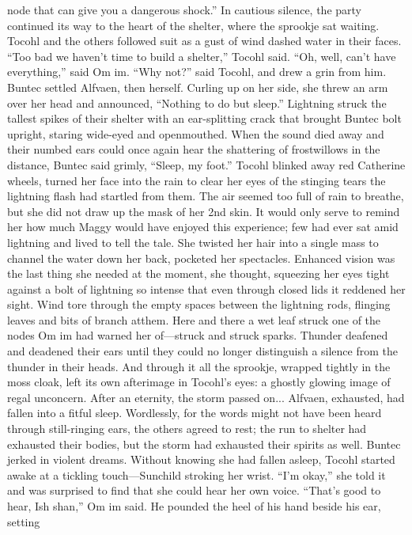 \documentclass[9pt]{article}
\begin{document}
node that can give you a dangerous shock.”
In cautious silence, the party continued its way to the heart of the shelter, where the sprookje sat
waiting. Tocohl and the others followed suit as a gust of wind dashed water in their faces.
“Too bad we haven’t time to build a shelter,” Tocohl said.
“Oh, well, can’t have everything,” said Om im.
“Why not?” said Tocohl, and drew a grin from him.
Buntec settled Alfvaen, then herself. Curling up on her side, she threw an arm over her head and
announced, “Nothing to do but sleep.”
Lightning struck the tallest spikes of their shelter with an ear-splitting crack that brought Buntec bolt
upright, staring wide-eyed and openmouthed. When the sound died away and their numbed ears could
once again hear the shattering of frostwillows in the distance, Buntec said grimly, “Sleep, my foot.”
Tocohl blinked away red Catherine wheels, turned her face into the rain to clear her eyes of the
stinging tears the lightning flash had startled from them. The air seemed too full of rain to breathe, but she
did not draw up the mask of her 2nd skin. It would only serve to remind her how much Maggy would
have enjoyed this experience; few had ever sat amid lightning and lived to tell the tale.
She twisted her hair into a single mass to channel the water down her back, pocketed her spectacles.
Enhanced vision was the last thing she needed at the moment, she thought, squeezing her eyes tight
against a bolt of lightning so intense that even through closed lids it reddened her sight.
Wind tore through the empty spaces between the lightning rods, flinging leaves and bits of branch atthem. Here and there a wet leaf struck one of the nodes Om im had warned her of—struck and struck
sparks.
Thunder deafened and deadened their ears until they could no longer distinguish a silence from the
thunder in their heads.
And through it all the sprookje, wrapped tightly in the moss cloak, left its own afterimage in Tocohl’s
eyes: a ghostly glowing image of regal unconcern.
After an eternity, the storm passed on...
Alfvaen, exhausted, had fallen into a fitful sleep. Wordlessly, for the words might not have been heard
through still-ringing ears, the others agreed to rest; the run to shelter had exhausted their bodies, but the
storm had exhausted their spirits as well. Buntec jerked in violent dreams.
Without knowing she had fallen asleep, Tocohl started awake at a tickling touch—Sunchild stroking
her wrist. “I’m okay,” she told it and was surprised to find that she could hear her own voice.
“That’s good to hear, Ish shan,” Om im said. He pounded the heel of his hand beside his ear, setting
\end{document}
